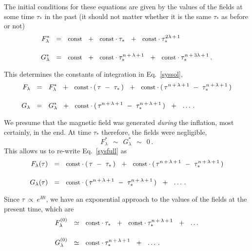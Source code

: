 \documentclass[12pt]{article}
\begin{document}
	The initial conditions for these equations are given by the values of the fields at some time $ \tau_* $ in the past
	(it should not matter whether it is the same $ \tau_* $ as before or not)
\begin{align}
%
\notag
	F^*_\lambda    & ~~=~~    \text{\small const}  ~~+~~  \text{\small const} \cdot \tau_*  ~~+~~  \text{\small const} \cdot \tau_*^{2 \lambda \,+\, 1} 
	\\[3.8mm]
%
	G^*_\lambda    & ~~=~~    \text{\small const}  ~~+~~  
				\text{\small const} \cdot \tau_*^{n \,+\, \lambda \,+\, 1}  ~~+~~  \text{\small const} \cdot \tau_*^{n \,+\, 3 \lambda \,+\, 1}\,.
\end{align}

	This determines the constants of integration in Eq.~\eqref{syssol},
\begin{align}
%
\label{sysfull}
	F_{\lambda}    & ~~=~~    F_\lambda^*  ~~+~~  \text{\small const} \cdot (\, \tau ~-~ \tau_* \,) 
						~~+~~  \text{\small const} \cdot (\, \tau^{n \,+\, \lambda \,+\, 1} ~-~ \tau_*^{n \,+\, \lambda \,+\, 1} \,)
	\\[3.8mm]
%
\notag
	G_{\lambda}    & ~~=~~    G_\lambda^*  ~~+~~  \text{\small const} \cdot (\, \tau^{n \,+\, \lambda \,+\, 1} ~-~ \tau_*^{n \,+\, \lambda \,+\, 1} \,)
						~~+~~  \dots\,.
\end{align}

	We presume that the magnetic field was generated {\it during} the inflation, most certainly, in the end.
	At time $ \tau_* $ therefore, the fields were negligible, 
\[
	F_\lambda^*    ~~\sim~~    G_\lambda^*    ~~\sim~~    0\,.
\]
	This allows us to re-write Eq.~\eqref{sysfull} as
\begin{align}
%
\notag
	F_{\lambda}(\tau)    & ~~=~~    \text{\small const} \cdot (\, \tau ~-~ \tau_* \,) 
					~~+~~  \text{\small const} \cdot (\, \tau^{n \,+\, \lambda \,+\, 1} ~-~ \tau_*^{n \,+\, \lambda \,+\, 1} \,)
	\\[3.8mm]
%
	G_{\lambda}(\tau)    & ~~=~~    \text{\small const} \cdot (\, \tau^{n \,+\, \lambda \,+\, 1} ~-~ \tau_*^{n \,+\, \lambda \,+\, 1} \,)
					~~+~~  \dots\,.
\end{align}
	
	Since $ \tau ~\propto~ e^{H t} $, we have an exponential approach to the values of the fields at the present time,
	which are
\begin{align}
%
\notag
	F_{\lambda}^{(0)}    & ~~\simeq~~    \text{\small const} \cdot \tau_*    ~~+~~    \text{\small const} \cdot \tau_*^{n \,+\, \lambda \,+\, 1} 
						~~+~~    \dots
	\\[3.8mm]
%
\label{solnow}
	G_{\lambda}^{(0)}    & ~~\simeq~~    \text{\small const} \cdot \tau_*^{n \,+\, \lambda \,+\, 1}    ~~+~~    \dots\,.
\end{align}
\end{document}
